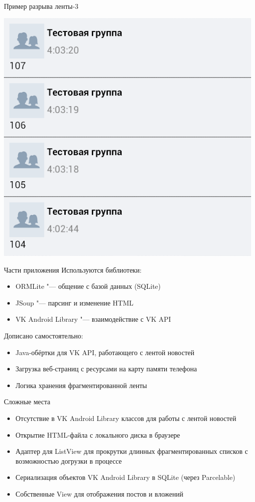 \documentclass[utf8,xcolor=table]{beamer}
\begin{document}
\begin{frame}[t]{Пример разрыва ленты-3}
	\begin{center}
		\includegraphics[scale=0.5]{c.png}
	\end{center}
\end{frame}

\begin{frame}[t]{Части приложения}
	Используются библиотеки:
	\begin{itemize}
		\item ORMLite "--- общение с базой данных (SQLite)
		\item JSoup "--- парсинг и изменение HTML
		\item VK Android Library "--- взаимодействие с VK API
	\end{itemize}
	Дописано самостоятельно:
	\begin{itemize}
		\item Java-обёртки для VK API, работающего с лентой новостей
		\item Загрузка веб-страниц с ресурсами на карту памяти телефона
		\item Логика хранения фрагментированной ленты
	\end{itemize}
\end{frame}

\begin{frame}[t]{Сложные места}
	\begin{itemize}
		\item Отсутствие в VK Android Library классов для работы с лентой новостей
		\item Открытие HTML-файла с локального диска в браузере
		\item Адаптер для ListView для прокрутки длинных фрагментированных списков с возможностью догрузки в процессе
		\item Сериализация объектов VK Android Library в SQLite (через Parcelable)
		\item Собственные View для отображения постов и вложений
	\end{itemize}
\end{frame}
\end{document}
